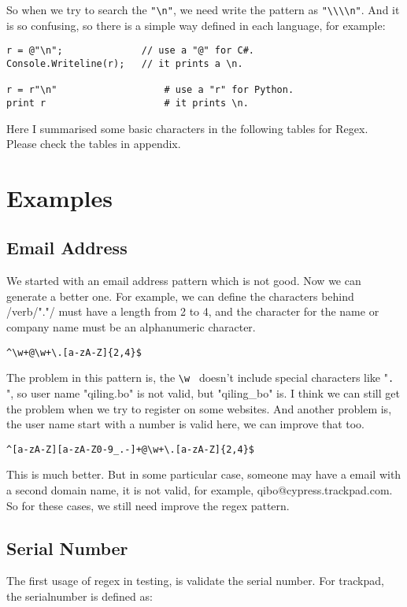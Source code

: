 So when we try to search the \verb/"\n"/, we need write the pattern as \verb/"\\\\n"/. And
it is so confusing, so there is a simple way defined in each language, for example:

\begin{lstlisting}
r = @"\n"; 				// use a "@" for C#.
Console.Writeline(r);	// it prints a \n.

r = r"\n"					# use a "r" for Python. 
print r						# it prints \n.
\end{lstlisting}

Here I summarised some basic characters in the following tables for Regex.\\
Please check the tables in appendix.




\section{Examples}
\subsection{Email Address}
We started with an email address pattern which is not good. Now we can generate a better one. For example, we can define the characters behind /verb/"."/ must have a length from 2 to 4, and the character for the name or company name must be an alphanumeric character.
\begin{lstlisting}
^\w+@\w+\.[a-zA-Z]{2,4}$
\end{lstlisting}
The problem in this pattern is, the \verb/\w / doesn't include special characters like "\verb/. /", so user name "qiling.bo" is not valid, but "qiling\_bo" is. I think we can still get the problem when we try to register on some websites. And another problem is, the user name start with a number is valid here, we can improve that too.
\begin{lstlisting}
^[a-zA-Z][a-zA-Z0-9_.-]+@\w+\.[a-zA-Z]{2,4}$
\end{lstlisting}
This is much better. But in some particular case, someone may have a email with a second domain name, it is not valid, for example, qibo@cypress.trackpad.com. So for these cases, we still need improve the regex pattern.\\

\subsection{Serial Number}
The first usage of regex in testing, is validate the serial number. For trackpad, the serialnumber is defined as:

